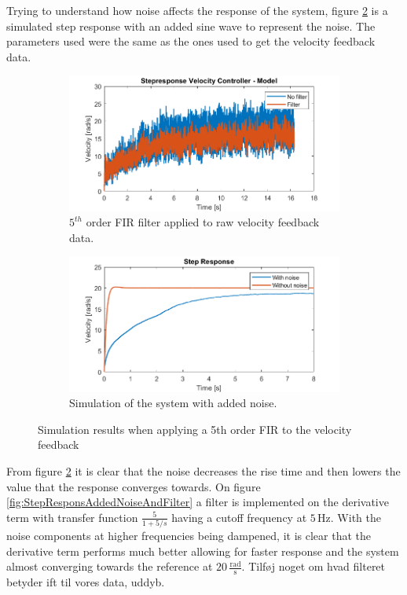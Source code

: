 \documentclass[../../main.tex]{subfiles}
\begin{document}
Trying to understand how noise affects the response of the system, figure  \ref{fig:StepResponsAddedNoise} is a simulated step response with an added sine wave to represent the noise. The parameters used were the same as the ones used to get the velocity feedback data. 

\begin{figure}[H]
     \centering
     \begin{subfigure}[b]{0.49\textwidth}
         \centering
    \includegraphics[width=\textwidth]{Sections/Miscellaneous/Images/FilteredStepRespons5Order.png}
    \caption{$5^{th}$ order FIR filter applied to raw velocity feedback data.}
    \label{fig:FilteredStepRespons5Order}
     \end{subfigure}
     \hfill
     \begin{subfigure}[b]{0.49\textwidth}
         \centering
         \includegraphics[width=\textwidth]{Sections/Miscellaneous/Images/StepresponsAddedNoise.png}
         \caption{Simulation of the system with added noise.}
         \label{fig:StepResponsAddedNoise}
     \end{subfigure}
        \caption{Simulation results when applying a 5th order FIR to the velocity feedback}
        \label{fig:FilterDiskussionImplementedFilter}
\end{figure}
From figure \ref{fig:StepResponsAddedNoise} it is clear that the noise decreases the rise time and then lowers the value that the response converges towards. On figure \ref{fig:StepResponsAddedNoiseAndFilter} a filter is implemented on the derivative term with transfer function $\frac{5}{1+5/s}$ having a cutoff frequency at $5\,\mathrm{Hz}$. With the noise components at higher frequencies being dampened, it is clear that the derivative term performs much better allowing for faster response and the system almost converging towards the reference at $20\,\frac{\mathrm{rad}}{\mathrm{s}}$. Tilføj noget om hvad filteret betyder ift til vores data, uddyb.\\
\end{document}
